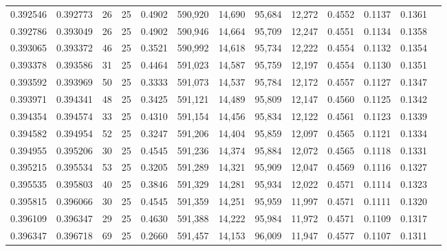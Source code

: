 \begin{tabular}{rrrrrrrrrrrrr}
0.392546 & 0.392773 &    26 &  25 &                                     0.4902 & 590,920 &  14,690 &  95,684 &  12,272 & 0.4552 & 0.1137 & 0.1361 \\
0.392786 & 0.393049 &    26 &  25 &                                     0.4902 & 590,946 &  14,664 &  95,709 &  12,247 & 0.4551 & 0.1134 & 0.1358 \\
0.393065 & 0.393372 &    46 &  25 &                                     0.3521 & 590,992 &  14,618 &  95,734 &  12,222 & 0.4554 & 0.1132 & 0.1354 \\
0.393378 & 0.393586 &    31 &  25 &                                     0.4464 & 591,023 &  14,587 &  95,759 &  12,197 & 0.4554 & 0.1130 & 0.1351 \\
0.393592 & 0.393969 &    50 &  25 &                                     0.3333 & 591,073 &  14,537 &  95,784 &  12,172 & 0.4557 & 0.1127 & 0.1347 \\
0.393971 & 0.394341 &    48 &  25 &                                     0.3425 & 591,121 &  14,489 &  95,809 &  12,147 & 0.4560 & 0.1125 & 0.1342 \\
0.394354 & 0.394574 &    33 &  25 &                                     0.4310 & 591,154 &  14,456 &  95,834 &  12,122 & 0.4561 & 0.1123 & 0.1339 \\
0.394582 & 0.394954 &    52 &  25 &                                     0.3247 & 591,206 &  14,404 &  95,859 &  12,097 & 0.4565 & 0.1121 & 0.1334 \\
0.394955 & 0.395206 &    30 &  25 &                                     0.4545 & 591,236 &  14,374 &  95,884 &  12,072 & 0.4565 & 0.1118 & 0.1331 \\
0.395215 & 0.395534 &    53 &  25 &                                     0.3205 & 591,289 &  14,321 &  95,909 &  12,047 & 0.4569 & 0.1116 & 0.1327 \\
0.395535 & 0.395803 &    40 &  25 &                                     0.3846 & 591,329 &  14,281 &  95,934 &  12,022 & 0.4571 & 0.1114 & 0.1323 \\
0.395815 & 0.396066 &    30 &  25 &                                     0.4545 & 591,359 &  14,251 &  95,959 &  11,997 & 0.4571 & 0.1111 & 0.1320 \\
0.396109 & 0.396347 &    29 &  25 &                                     0.4630 & 591,388 &  14,222 &  95,984 &  11,972 & 0.4571 & 0.1109 & 0.1317 \\
0.396347 & 0.396718 &    69 &  25 &                                     0.2660 & 591,457 &  14,153 &  96,009 &  11,947 & 0.4577 & 0.1107 & 0.1311 \\

\end{tabular}
